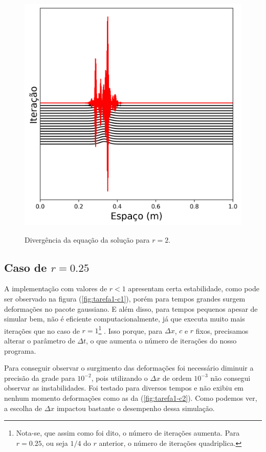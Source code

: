 \documentclass[a4paper, 11pt]{tufte-handout}
\begin{document}
\begin{figure}[h!] 
    \centering
    \caption{Divergência da equação da solução para \( r = 2 \).
    }
    \includegraphics[width=0.5\linewidth]{graf-tarefa1-b}
    \label{fig:tarefa1-b}
\end{figure}


\subsection{Caso de \( r = 0.25 \) }

A implementação com valores de \( r < 1 \) apresentam certa estabilidade, como pode ser observado
na figura (\ref{fig:tarefa1-c1}), porém para tempos grandes surgem deformações no
pacote gaussiano. E além disso, para tempos pequenos apesar de simular bem, não é eficiente
computacionalmente, já que executa muito mais iterações que no caso de \( r = 1 \)\footnote{Nota-se, que assim como
        foi dito, o número de iterações aumenta.  Para \( r = 0.25 \), ou seja \( 1/4 \) do \( r \) anterior, o número de iterações quadriplica.}
. Isso porque, para
\( \Delta x \), \( c \) e \( r \) fixos, precisamos alterar o parâmetro de \( \Delta t \), o que aumenta
o número de iterações do nosso programa.

Para conseguir observar o surgimento das deformações foi necessário diminuir a precisão da grade
para \( 10^{-2} \), pois utilizando o \( \Delta x \) de ordem \( 10^{-3} \) não consegui observar as
instabilidades. Foi testado para diversos tempos e não exibiu em nenhum momento deformações como as
da (\ref{fig:tarefa1-c2}). Como podemos ver, a escolha de \( \Delta x\) impactou bastante o desempenho
dessa simulação.
\end{document}
